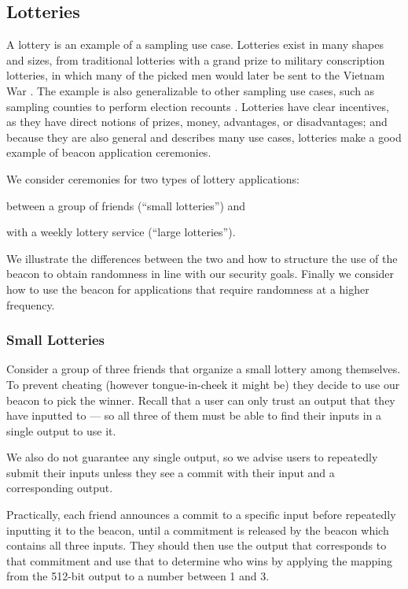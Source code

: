 \subsection{Lotteries}
A lottery is an example of a sampling use case.
Lotteries exist in many shapes and sizes, from traditional lotteries with a grand prize to military conscription lotteries, in which many of the picked men would later be sent to the Vietnam War \cite{starr1997nonrandom}. The example is also generalizable to other sampling use cases, such as sampling counties to perform election recounts \cite{bushgore}. Lotteries have clear incentives, as they have direct notions of prizes, money, advantages, or disadvantages; and because they are also general and describes many use cases, lotteries make a good example of beacon application ceremonies.

We consider ceremonies for two types of lottery applications:
\begin{eletterate*}
\item between a group of friends (\enquote{small lotteries}) and
\item with a weekly lottery service (\enquote{large lotteries}).
\end{eletterate*}
We illustrate the differences between the two and how to structure the use of the beacon to obtain randomness in line with our security goals.
Finally we consider how to use the beacon for applications that require randomness at a higher frequency.

\subsubsection{Small Lotteries}
Consider a group of three friends that organize a small lottery among themselves.
To prevent cheating (however tongue-in-cheek it might be) they decide to use our beacon to pick the winner.
Recall that a user can only trust an output that they have inputted to --- so all three of them must be able to find their inputs in a single output to use it.

We also do not guarantee any single output, so we advise users to repeatedly submit their inputs unless they see a commit with their input and a corresponding output.

Practically, each friend announces a commit to a specific input before repeatedly inputting it to the beacon, until a commitment is released by the beacon which contains all three inputs.
They should then use the output that corresponds to that commitment and use that to determine who wins by applying the mapping from the 512-bit output to a number between 1 and 3.

